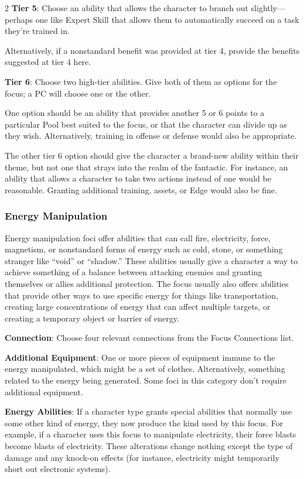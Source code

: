 \begin{multicols}{2}
\textbf{Tier 5}: Choose an ability that allows the character to branch out slightly—perhaps one like Expert Skill that allows them to automatically succeed on a task they’re trained in.

Alternatively, if a nonstandard benefit was provided at tier 4, provide the benefits suggested at tier 4 here.

\textbf{Tier 6}: Choose two high-tier abilities. Give both of them as options for the focus; a PC will choose one or the other.

One option should be an ability that provides another 5 or 6 points to a particular Pool best suited to the focus, or that the character can divide up as they wish. Alternatively, training in offense or defense would also be appropriate.

The other tier 6 option should give the character a brand-new ability within their theme, but not one that strays into the realm of the fantastic. For instance, an ability that allows a character to take two actions instead of one would be reasonable. Granting additional training, assets, or Edge would also be fine.

\subsubsection{Energy Manipulation}

Energy manipulation foci offer abilities that can call fire, electricity, force, magnetism, or nonstandard forms of energy such as cold, stone, or something stranger like “void” or “shadow.” These abilities usually give a character a way to achieve something of a balance between attacking enemies and granting themselves or allies additional protection. The focus usually also offers abilities that provide other ways to use specific energy for things like transportation, creating large concentrations of energy that can affect multiple targets, or creating a temporary object or barrier of energy.

\textbf{Connection}: Choose four relevant connections from the Focus Connections list. 

\textbf{Additional Equipment}: One or more pieces of equipment immune to the energy manipulated, which might be a set of clothes. Alternatively, something related to the energy being generated. Some foci in this category don’t require additional equipment.

\textbf{Energy Abilities}: If a character type grants special abilities that normally use some other kind of energy, they now produce the kind used by this focus. For example, if a character uses this focus to manipulate electricity, their force blasts become blasts of electricity. These alterations change nothing except the type of damage and any knock-on effects (for instance, electricity might temporarily short out electronic systems). 


\end{multicols}
